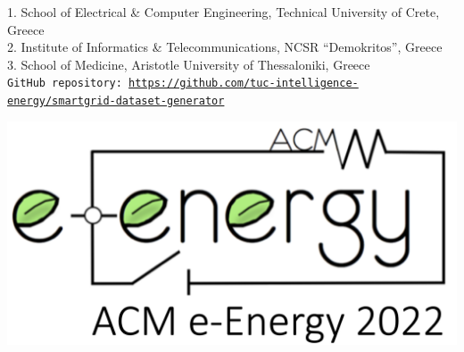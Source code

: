 \documentclass{article}
\begin{document}
\begin{center}
\begin{minipage}{.6\linewidth}
\begin{center}
\small 1. School of Electrical \& Computer Engineering, Technical University of Crete, Greece\\[0.1cm] %
\small 2. Institute of Informatics \& Telecommunications,
NCSR ``Demokritos'', Greece\\[0.1cm] %
\small 3. School of Medicine,
Aristotle University of Thessaloniki, Greece\\[0.1cm] %
\small \texttt{GitHub repository: \url{https://github.com/tuc-intelligence-energy/smartgrid-dataset-generator}}\\
    \end{center}
  \end{minipage}
  \hspace{.03\linewidth}
  \begin{minipage}{0.16\linewidth}
    \begin{flushright}
      \includegraphics[scale=2,width=\linewidth]{figures/eenergy2022-logo.png}
\hspace{1cm}
    \end{flushright}
  \end{minipage}
\end{center}

\vspace{.1cm}


\setlength{\columnsep}{1cm}
\end{document}
